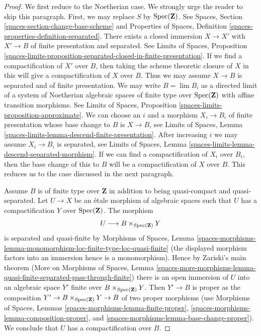 \begin{proof}
We first reduce to the Noetherian case. We strongly urge the reader
to skip this paragraph. First, we may replace $S$ by $\operatorname{Spec}(\mathbf{Z})$.
See Spaces, Section \ref{spaces-section-change-base-scheme} and
Properties of Spaces, Definition \ref{spaces-properties-definition-separated}.
There exists a closed immersion
$X \to X'$ with $X' \to B$ of finite presentation and separated.
See Limits of Spaces, Proposition
\ref{spaces-limits-proposition-separated-closed-in-finite-presentation}.
If we find a compactification of $X'$ over $B$, then
taking the scheme theoretic closure of $X$ in this will give
a compactification of $X$ over $B$. Thus we may assume
$X \to B$ is separated and of finite presentation.
We may write $B = \lim B_i$ as a directed
limit of a system of Noetherian algebraic spaces
of finite type over $\operatorname{Spec}(\mathbf{Z})$
with affine transition morphisms.
See Limits of Spaces, Proposition \ref{spaces-limits-proposition-approximate}.
We can choose an $i$ and a morphism $X_i \to B_i$ of finite
presentation whose base change to $B$ is $X \to B$, see
Limits of Spaces, Lemma \ref{spaces-limits-lemma-descend-finite-presentation}.
After increasing $i$ we may assume $X_i \to B_i$ is separated, see
Limits of Spaces, Lemma
\ref{spaces-limits-lemma-descend-separated-morphism}.
If we can find a compactification of $X_i$ over $B_i$, then the
base change of this to $B$ will be a compactification of $X$ over $B$.
This reduces us to the case discussed in the next paragraph.

\medskip\noindent
Assume $B$ is of finite type over $\mathbf{Z}$ in addition to being
quasi-compact and quasi-separated. Let $U \to X$ be an \'etale
morphism of algebraic spaces such that $U$ has a compactification
$Y$ over $\operatorname{Spec}(\mathbf{Z})$. The morphism
$$
U \longrightarrow B \times_{\operatorname{Spec}(\mathbf{Z})} Y
$$
is separated and quasi-finite by Morphisms of Spaces, Lemma
\ref{spaces-morphisms-lemma-monomorphism-loc-finite-type-loc-quasi-finite}
(the displayed morphism factors into an immersion hence is a monomorphism).
Hence by Zariski's main theorem (More on Morphisms of Spaces, Lemma
\ref{spaces-more-morphisms-lemma-quasi-finite-separated-pass-through-finite})
there is an open immersion of $U$ into an algebraic space $Y'$
finite over $B \times_{\operatorname{Spec}(\mathbf{Z})} Y$. Then $Y' \to B$ is proper
as the composition $Y' \to B \times_{\operatorname{Spec}(\mathbf{Z})} Y \to B$
of two proper morphisms
(use Morphisms of Spaces, Lemmas \ref{spaces-morphisms-lemma-finite-proper},
\ref{spaces-morphisms-lemma-composition-proper}, and
\ref{spaces-morphisms-lemma-base-change-proper}).
We conclude that $U$ has a compactification over $B$.


\end{proof}

